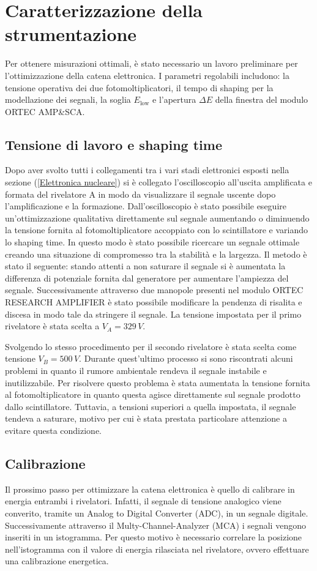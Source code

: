 \section{Caratterizzazione della strumentazione}%
Per ottenere misurazioni ottimali, è stato necessario un lavoro preliminare per l'ottimizzazione della catena elettronica. I parametri regolabili includono: la tensione operativa dei due fotomoltiplicatori, il tempo di shaping per la modellazione dei segnali, la soglia $E_{\text{low}}$ e l'apertura $\Delta E$ della finestra del modulo ORTEC AMP\&SCA.
\subsection{Tensione di lavoro e shaping time}%
Dopo aver svolto tutti i collegamenti tra i vari stadi elettronici esposti nella sezione (\ref{Elettronica nucleare}) si è collegato l'oscilloscopio all'uscita amplificata e formata del rivelatore A in modo da visualizzare il segnale uscente dopo l'amplificazione e la formazione. Dall'oscilloscopio è stato possibile eseguire un'ottimizzazione qualitativa direttamente sul segnale aumentando o diminuendo la tensione fornita al fotomoltiplicatore accoppiato con lo scintillatore e variando lo shaping time. In questo modo è stato possibile ricercare un segnale ottimale creando una situazione di compromesso tra la stabilità e la largezza. Il metodo è stato il seguente: stando attenti a non saturare il segnale si è aumentata la differenza di potenziale fornita dal generatore per aumentare l'ampiezza del segnale. Successivamente attraverso due manopole presenti nel modulo ORTEC RESEARCH AMPLIFIER è stato possibile modificare la  pendenza di risalita e discesa in modo tale da stringere il segnale. La tensione impostata per il primo rivelatore è stata scelta a $V_A=329\,\unit{V}$.

Svolgendo lo stesso procedimento per il secondo rivelatore è stata scelta come tensione $V_B=500\,\unit{V}$. Durante quest'ultimo processo si sono riscontrati alcuni problemi in quanto il rumore ambientale rendeva il segnale instabile e inutilizzabile. Per risolvere questo problema è stata aumentata la tensione fornita al fotomoltiplicatore in quanto questa agisce direttamente sul segnale prodotto dallo scintillatore. Tuttavia, a tensioni superiori a quella impostata, il segnale tendeva a saturare, motivo per cui è stata prestata particolare attenzione a evitare questa condizione.
\subsection{Calibrazione}\label{Sez calibrazione}
Il prossimo passo per ottimizzare la catena elettronica è quello di calibrare in energia entrambi i rivelatori. Infatti, il segnale di tensione analogico viene converito, tramite un Analog to Digital Converter (ADC), in un segnale digitale. Successivamente attraverso il Multy-Channel-Analyzer (MCA) i segnali vengono inseriti in un istogramma. Per questo motivo è necessario correlare la posizione nell'istogramma con il valore di energia rilasciata nel rivelatore, ovvero effettuare una calibrazione energetica. 

